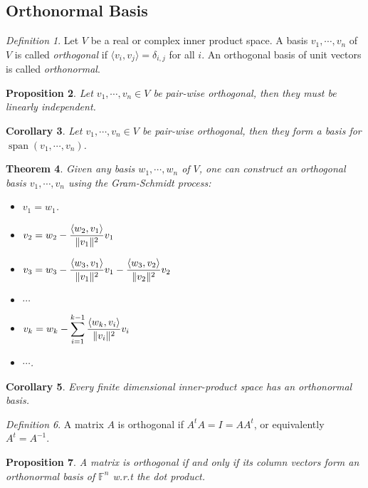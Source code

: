 \documentclass[12pt]{amsart}
\newcommand{\fff}[0]{\mathbb{F}}
\DeclareMathOperator{\s}{span}
\newtheorem{theorem}{Theorem}[section]
\newtheorem{proposition}[theorem]{Proposition}
\newtheorem{corollary}[theorem]{Corollary}
\theoremstyle{remark}
\newtheorem{definition}[theorem]{Definition}
\numberwithin{equation}{section}
\begin{document}
	\subsection{Orthonormal Basis}
	\begin{definition}Let $V$ be a real or complex inner product space.
		A basis $v_1,\cdots,v_n$ of $V$ is called \emph{orthogonal} if $\langle v_i,v_j\rangle =\delta_{i,j}$ for all $i$. An orthogonal basis of unit vectors is called \emph{orthonormal}.
	\end{definition}
	\begin{proposition}
		Let $v_1,\cdots,v_n\in V$ be pair-wise orthogonal, then they must be linearly independent. 
	\end{proposition}
	\begin{corollary}
		Let $v_1,\cdots,v_n\in V$ be pair-wise orthogonal, then they form a basis for $\s(v_1,\cdots,v_n)$.
	\end{corollary}
	\begin{theorem}
		Given any basis $w_1,\cdots,w_n$ of $V$, one can construct an orthogonal basis $v_1,\cdots,v_n$ using the Gram-Schmidt process:
		\begin{itemize}
			\item $v_1=w_1$.
			\item $\displaystyle v_2=w_2-{\langle w_2,v_1\rangle \over \Vert v_1\Vert ^2}v_1$
			\item $\displaystyle v_3=w_3-{\langle w_3,v_1\rangle \over \Vert v_1\Vert ^2}v_1-{\langle w_3,v_2\rangle \over \Vert v_2\Vert ^2}v_2$
			\item $\cdots$
			\item $\displaystyle v_k=w_k-\sum_{i=1}^{k-1}{\langle w_k,v_i\rangle \over \Vert v_i\Vert ^2}v_i$
			\item $\cdots$.
		\end{itemize}
	\end{theorem}
	\begin{corollary}
		Every finite dimensional inner-product space has an orthonormal basis.
	\end{corollary}
	\begin{definition}
		A matrix $A$ is orthogonal if $A^tA=I=AA^t$, or equivalently $A^t=A^{-1}$.
	\end{definition}
	\begin{proposition}
		A matrix is orthogonal if and only if its column vectors form an orthonormal basis of $\fff^n$ w.r.t the dot product.
	\end{proposition}
	
	
	
\end{document}
